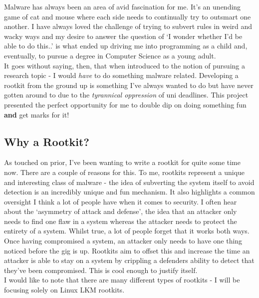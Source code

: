\documentclass[11pt]{article}
\begin{document}
Malware has always been an area of avid fascination for me. It's an unending game of cat and mouse where each side needs to continually try to outsmart one another. I have always loved the challenge of trying to subvert rules in weird and wacky ways and my desire to answer the question of `I wonder whether I'd be able to do this..' is what ended up driving me into programming as a child and, eventually, to pursue a degree in Computer Science as a young adult.\\

It goes without saying, then, that when introduced to the notion of pursuing a research topic - I would \textit{have} to do something malware related. Developing a rootkit from the ground up is something I've always wanted to do but have never gotten around to due to the \textit{tyrannical oppression} of uni deadlines. This project presented the perfect opportunity for me to double dip on doing something fun \textbf{and} get marks for it!\\

\subsection{Why a Rootkit?}
As touched on prior, I've been wanting to write a rootkit for quite some time now. There are a couple of reasons for this. To me, rootkits represent a unique and interesting class of malware - the idea of subverting the system itself to avoid detection is an incredibly unique and fun mechanism. It also highlights a common oversight I think a lot of people have when it comes to security. I often hear about the `asymmetry of attack and defense', the idea that an attacker only needs to find one flaw in a system whereas the attacker needs to protect the entirety of a system. Whilst true, a lot of people forget that it works both ways. Once having compromised a system, an attacker only needs to have one thing noticed before the gig is up. Rootkits aim to offset this and increase the time an attacker is able to stay on a system by crippling a defenders ability to detect that they've been compromised. This is cool enough to justify itself.\\

I would like to note that there are many different types of rootkits - I will be focusing solely on Linux LKM rootkits.
\end{document}
